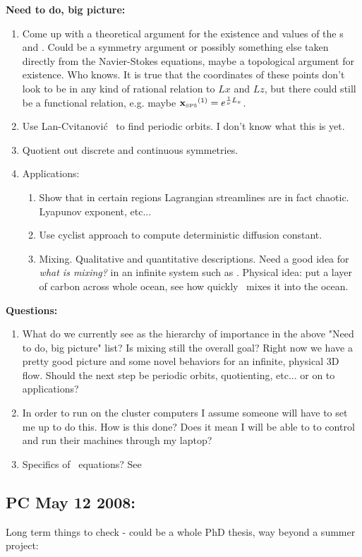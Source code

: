 \textbf{Need to do, big picture:}
\begin{enumerate}
\item Come up with a theoretical argument for the existence and
values of the \stagp s  and . Could be a symmetry
argument or possibly something else taken directly from the
Navier-Stokes equations, maybe a topological argument for existence.
Who knows. It is true that the coordinates of these points don't
look to be in any kind of rational relation to $Lx$ and $Lz$, but
there could still be a functional relation, e.g. maybe
${{\bf x}_{\text{\tiny SP5}}}^{(1)} = e^{\frac{1}{\nu}L_{x}}$.
\item Use Lan-Cvitanovi\'c \descent\ to find periodic orbits. I
don't know what this is yet.
\item Quotient out discrete and continuous symmetries.
\item Applications:
 \begin{enumerate}
 \item Show that in certain regions Lagrangian streamlines are in
 fact chaotic. Lyapunov exponent, etc...
 \item Use cyclist approach to compute deterministic diffusion
 constant.
 \item Mixing. Qualitative and quantitative descriptions. Need a good idea for {\em what is mixing?} in an infinite
    system such as \pCf. Physical
    idea: put a layer of carbon
    across whole ocean, see how quickly \pCf\ mixes it into
    the ocean.
 \end{enumerate}
\end{enumerate}
\textbf{Questions:}
\begin{enumerate}
\item What do we currently see as the hierarchy of importance in the
above "Need to do, big picture" list? Is mixing still the overall
goal? Right now we have a pretty good picture and some novel
behaviors for an infinite, physical 3D flow. Should the next step be
periodic orbits, quotienting, etc... or on to applications?
\item In order to run on the cluster computers I assume someone will
have to set me up to do this. How is this done? Does it mean I will
be able to to control and run their machines through my laptop?
\item Specifics of \NS\ equations? See 
\end{enumerate}

 \subsection{PC May 12 2008:}
  Long term things
to check - could be a whole PhD thesis, way beyond a summer project:

